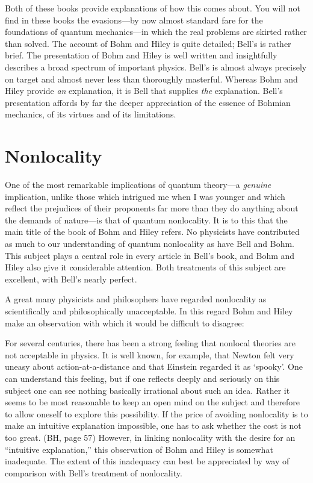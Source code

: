 Both of these books provide explanations of how this comes about. You will
not find in these books the evasions---by now almost standard fare for the
foundations of quantum mechanics---in which the real problems are skirted
rather than solved.  The account of Bohm and Hiley is quite detailed;
Bell's is rather brief. The presentation of Bohm and Hiley is well written and
insightfully describes a broad spectrum of important physics. Bell's
is almost always precisely on target and almost never less than
thoroughly masterful. Whereas Bohm and Hiley provide {\it an\/}
explanation, it is Bell that supplies {\it the \/} explanation.  Bell's
presentation affords by far the deeper appreciation of the essence of
Bohmian mechanics, of its virtues and of its limitations.

\section*{Nonlocality}

One of the most remarkable implications of quantum theory---a {\it
genuine\/} implication, unlike those which intrigued me when I was younger
and which reflect the prejudices of their proponents far more than they do
anything about the demands of nature---is that of quantum nonlocality. It
is to this that the main title of the book of Bohm and Hiley refers. No
physicists have contributed as much to our understanding of quantum
nonlocality as have Bell and Bohm. This subject plays a central role in
every article in Bell's book, and Bohm and Hiley also give it considerable
attention. Both treatments of this subject are excellent, with Bell's
nearly perfect.

A great many physicists and philosophers have regarded nonlocality as
scientifically and philosophically unacceptable. In this regard Bohm and
Hiley make an observation with which it would be difficult to disagree:

\bq For several centuries, there has been a strong feeling that nonlocal
theories are not acceptable in physics. It is well known, for example, that
Newton felt very uneasy about action-at-a-distance and that Einstein
regarded it as `spooky'. One can understand this feeling, but if one
reflects deeply and seriously on this subject one can see nothing basically
irrational about such an idea. Rather it seems to be most reasonable to
keep an open mind on the subject and therefore to allow oneself to explore
this possibility. If the price of avoiding nonlocality is to make an
intuitive explanation  impossible, one has to ask whether the cost is not
too great. (BH, page 57)
\eq
However, in linking nonlocality with the desire for an ``intuitive
explanation,'' this observation of Bohm and Hiley is somewhat inadequate.
The extent of this inadequacy can best be appreciated by way of comparison with
Bell's  treatment of nonlocality.

